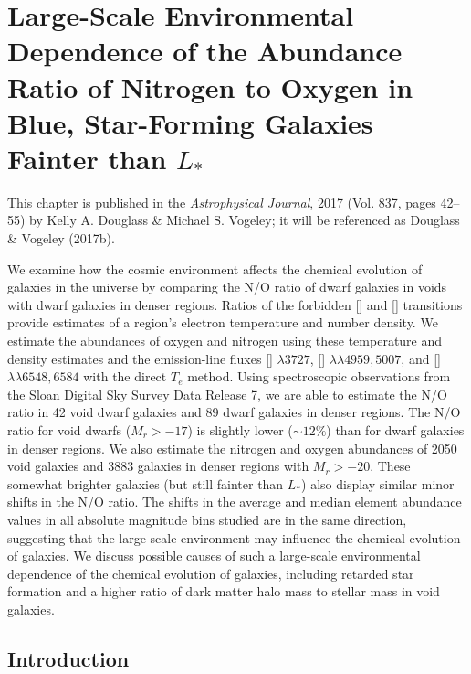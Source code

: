 \chapter[N/O Ratio in Dwarf Galaxies]{Large-Scale Environmental Dependence of the Abundance Ratio of Nitrogen to Oxygen in Blue, Star-Forming Galaxies Fainter than $L_*$}\label{ch:Paper2}


This chapter is published in the \emph{Astrophysical Journal}, 2017 (Vol. 837, 
pages 42--55) by Kelly A. Douglass \& Michael S. Vogeley; it will be referenced 
as Douglass \& Vogeley (2017b).

\begin{chapabstract}
We examine how the cosmic environment affects the chemical evolution of galaxies 
in the universe by comparing the N/O ratio of dwarf galaxies in voids with 
dwarf galaxies in denser regions.  Ratios of the forbidden [] and 
[] transitions provide estimates of a region's electron temperature 
and number density.  We estimate the abundances of oxygen and nitrogen using 
these temperature and density estimates and the emission-line fluxes 
[] $\lambda 3727$, [] $\lambda \lambda 4959, 5007$, and 
[] $\lambda \lambda 6548, 6584$ with the direct $T_e$ method.  Using 
spectroscopic observations from the Sloan Digital Sky Survey Data Release 7, we 
are able to estimate the N/O ratio in 42 void dwarf galaxies and 89 dwarf 
galaxies in denser regions.  The N/O ratio for void dwarfs ($M_r > -17$) is 
slightly lower ($\sim 12\%$) than for dwarf galaxies in denser regions.   We 
also estimate the nitrogen and oxygen abundances of 2050 void galaxies and 3883 
galaxies in denser regions with $M_r > -20$.  These somewhat brighter galaxies 
(but still fainter than $L_*$) also display similar minor shifts in the N/O 
ratio.  The shifts in the average and median element abundance values in all 
absolute magnitude bins studied are in the same direction, suggesting that the 
large-scale environment may influence the chemical evolution of galaxies.  We 
discuss possible causes of such a large-scale environmental dependence of the 
chemical evolution of galaxies, including retarded star formation and a higher 
ratio of dark matter halo mass to stellar mass in void galaxies.
\end{chapabstract}


%
%
\section{Introduction}

